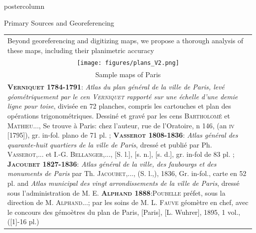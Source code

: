 \documentclass[final,hyperref={pdfpagelabels=false}]{beamer}
\let\oldcite=\cite
\renewcommand{\cite}[1]{\textcolor{ta3chameleon}{\oldcite{#1}}}
\begin{document}
\begin{frame}
\begin{columns}
\begin{column}{0.5\textwidth}
\begin{beamercolorbox}[center,wd=\textwidth]{postercolumn}
    \begin{minipage}[t]{.98\textwidth}
    \renewcommand{\footnoterule}{}
    \begin{block}{Primary Sources and Georeferencing}
      \centering
      \begin{tabular}{p{}p{}}
        \multicolumn{2}{p{0.98\textwidth}}{Beyond georeferencing and digitizing maps, we propose a thorough analysis of these maps, including their planimetric accuracy~\cite{Dumenieu2013a,Dumenieu2015PhD,Dumenieu2018}}\\
        \multicolumn{2}{c}{\texttt{[image: figures/plans\_V2.png]}}\\
	\multicolumn{2}{c}{\scriptsize Sample maps of Paris}\\%
        \multicolumn{2}{p{0.98\textwidth}}{
          \tiny{
            \textsc{\textbf{Verniquet 1784-1791}:}
            \textit{Atlas du plan général de la ville de Paris, levé géométriquement par le cen \textsc{Verniquet} rapporté sur une échelle d'une demie ligne pour toise}, divisée en 72 planches, compris les cartouches et plan des opérations trigonométriques.
            Dessiné et gravé par les cens \textsc{Bartholomé} et \textsc{Mathieu}...,
            Se trouve à Paris: chez l'auteur, rue de l'Oratoire, n 146, (an \textsc{iv} [1795]), gr. in-fol. plano de 71 pl. ;
            \textsc{\textbf{Vasserot 1808-1836}:}
            \textit{Atlas général des quarante-huit quartiers de la ville de Paris}, dressé et publié par Ph. \textsc{Vasserot},... et I.-G. \textsc{Bellanger},..., [S. l.], [s. n.], [s. d.], gr. in-fol de 83 pl. ;
            \textsc{\textbf{Jacoubet 1827-1836}:}
            \textit{Atlas général de la ville, des faubourgs et des monuments de Paris} par Th. \textsc{Jacoubet},..., (S. l.,), 1836, Gr. in-fol., carte en 52 pl. and \textit{Atlas municipal des vingt arrondissements de la ville de Paris}, dressé sous l'administration de M. E.
            \textsc{\textbf{Alphand 1888}:}\textsc{Poubelle} préfet, sous la direction de M. \textsc{Alphand}...; par les soins de M. L. \textsc{Fauve} géomètre en chef, avec le concours des gémoètres du plan de Paris, [Paris], [L. Wuhrer], 1895, 1 vol., ([1]-16 pl.)
          }
        }\\
	

\end{tabular}
\end{block}
\end{minipage}
\end{beamercolorbox}
\end{column}
\end{columns}
\end{frame}
\end{document}
